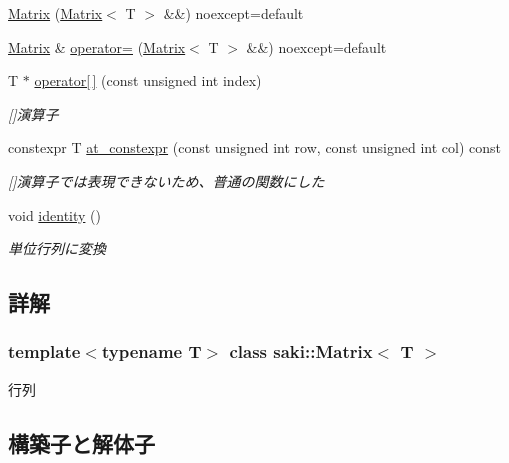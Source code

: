 \begin{DoxyCompactItemize}
\mbox{\hyperlink{classsaki_1_1_matrix_aced6f31e05917c2c41305dd0be082f8b}{Matrix}} (\mbox{\hyperlink{classsaki_1_1_matrix}{Matrix}}$<$ T $>$ \&\&) noexcept=default
\item 
\mbox{\hyperlink{classsaki_1_1_matrix}{Matrix}} \& \mbox{\hyperlink{classsaki_1_1_matrix_a96b3519d691108a606d4ece3a9bac134}{operator=}} (\mbox{\hyperlink{classsaki_1_1_matrix}{Matrix}}$<$ T $>$ \&\&) noexcept=default
\item 
T $\ast$ \mbox{\hyperlink{classsaki_1_1_matrix_ad1fa9ab13d6ab9def73a4ac5bfa15cf4}{operator\mbox{[}$\,$\mbox{]}}} (const unsigned int index)
\begin{DoxyCompactList}\small\item\em \mbox{[}\mbox{]}演算子 \end{DoxyCompactList}\item 
constexpr T \mbox{\hyperlink{classsaki_1_1_matrix_ac9e6609628221255fd9577eceb9ab2af}{at\+\_\+constexpr}} (const unsigned int row, const unsigned int col) const
\begin{DoxyCompactList}\small\item\em \mbox{[}\mbox{]}演算子では表現できないため、普通の関数にした \end{DoxyCompactList}\item 
void \mbox{\hyperlink{classsaki_1_1_matrix_af0c4f3614c29e27eae5fecde22140be8}{identity}} ()
\begin{DoxyCompactList}\small\item\em 単位行列に変換 \end{DoxyCompactList}\end{DoxyCompactItemize}


\subsection{詳解}
\subsubsection*{template$<$typename T$>$\newline
class saki\+::\+Matrix$<$ T $>$}

行列 

\subsection{構築子と解体子}
\mbox{\label{classsaki_1_1_matrix_a820035e9bafc0fa4269c4b94b1ec4f4f}} 
